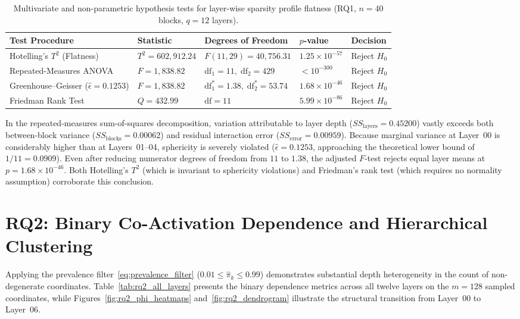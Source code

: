 \documentclass[12pt, a4paper, oneside]{report}
\theoremstyle{definition}
\begin{document}
\begin{table}[htbp]
    \centering
    \caption{Multivariate and non-parametric hypothesis tests for layer-wise sparsity profile flatness (RQ1, $n = 40$ blocks, $q = 12$ layers).}
    \label{tab:rq1_tests}
    \small
    \begin{tabularx}{\textwidth}{@{}l l l l X@{}}
        \toprule
        \textbf{Test Procedure} & \textbf{Statistic} & \textbf{Degrees of Freedom} & \textbf{$p$-value} & \textbf{Decision} \\
        \midrule
        Hotelling's $T^2$ (Flatness) & $T^2 = 602{,}912.24$ & $F(11, 29) = 40{,}756.31$ & $1.25 \times 10^{-57}$ & Reject $H_0$ \\
        Repeated-Measures ANOVA & $F = 1{,}838.82$ & $\mathrm{df}_1 = 11,\; \mathrm{df}_2 = 429$ & $< 10^{-300}$ & Reject $H_0$ \\
        Greenhouse--Geisser ($\hat{\epsilon}=0.1253$) & $F = 1{,}838.82$ & $\mathrm{df}_1^* = 1.38,\; \mathrm{df}_2^* = 53.74$ & $1.68 \times 10^{-46}$ & Reject $H_0$ \\
        Friedman Rank Test & $Q = 432.99$ & $\mathrm{df} = 11$ & $5.99 \times 10^{-86}$ & Reject $H_0$ \\
        \bottomrule
    \end{tabularx}
\end{table}

In the repeated-measures sum-of-squares decomposition, variation attributable to layer depth ($SS_{\text{layers}} = 0.45200$) vastly exceeds both between-block variance ($SS_{\text{blocks}} = 0.00062$) and residual interaction error ($SS_{\text{error}} = 0.00959$). Because marginal variance at Layer~00 is considerably higher than at Layers~01--04, sphericity is severely violated ($\hat{\epsilon} = 0.1253$, approaching the theoretical lower bound of $1/11 = 0.0909$). Even after reducing numerator degrees of freedom from $11$ to $1.38$, the adjusted $F$-test rejects equal layer means at $p = 1.68 \times 10^{-46}$. Both Hotelling's $T^2$ (which is invariant to sphericity violations) and Friedman's rank test (which requires no normality assumption) corroborate this conclusion.

\section{RQ2: Binary Co-Activation Dependence and Hierarchical Clustering}

Applying the prevalence filter~\eqref{eq:prevalence_filter} ($0.01 \le \hat{\pi}_k \le 0.99$) demonstrates substantial depth heterogeneity in the count of non-degenerate coordinates. Table~\ref{tab:rq2_all_layers} presents the binary dependence metrics across all twelve layers on the $m = 128$ sampled coordinates, while Figures~\ref{fig:rq2_phi_heatmaps} and~\ref{fig:rq2_dendrogram} illustrate the structural transition from Layer~00 to Layer~06.
\end{document}

